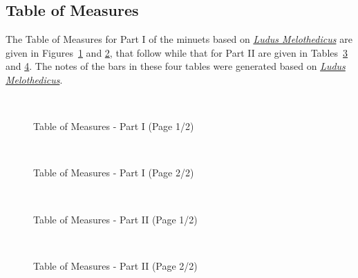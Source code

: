\documentclass[a4paper,x11names,svgnames,10pt]{article}
\begin{document}
{\subsection{Table of Measures}\label{tabMeas}

The Table of Measures for Part I of the minuets based on \href{https://imslp.org/wiki/Ludus_Melothedicus_(Anonymous)}{{\em Ludus Melothedicus}} are given in Figures~\ref{fig:meas1} and  \ref{fig:meas2}, that follow while that for Part II are given in Tables~\ref{fig:meas3} and \ref{fig:meas4}.  The notes of the bars in these four tables were generated based on \href{https://imslp.org/wiki/Ludus_Melothedicus_(Anonymous)}{\href{https://imslp.org/wiki/Ludus_Melothedicus_(Anonymous)}{{\em Ludus Melothedicus}}}.

${}_{}$\\
\vspace{0.10in}
\begin{figure}[H]
	\centering
	\def\svgwidth{0.975\columnwidth}
	
	\caption{Table of Measures - Part I (Page 1/2)}
	\label{fig:meas1}
\end{figure}

\newpage
${}_{}$\\
\vspace{0.10in}
\begin{figure}[H]
	\centering
	\def\svgwidth{0.975\columnwidth}
	
	\caption{Table of Measures - Part I (Page 2/2)}
	\label{fig:meas2}
\end{figure}

${}_{}$\\
\vspace{0.10in}
\begin{figure}[H]
	\centering
	\def\svgwidth{0.975\columnwidth}
	
	\caption{Table of Measures - Part II (Page 1/2)}
	\label{fig:meas3}
\end{figure}

\newpage
${}_{}$\\
\vspace{0.10in}
\begin{figure}[H]
	\centering
	\def\svgwidth{0.975\columnwidth}
	
	\caption{Table of Measures - Part II (Page 2/2)}
	\label{fig:meas4}
\end{figure}



}
\end{document}
